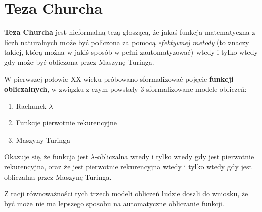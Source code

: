 \section{Teza Churcha}

\textbf{Teza Churcha} jest nieformalną tezą głoszącą, że jakaś funkcja matematyczna z liczb naturalnych może być policzona za pomocą \textit{efektywnej metody} (to znaczy takiej, którą można w jakiś sposób w pełni zautomatyzować) wtedy i tylko wtedy gdy może być obliczona przez Maszynę Turinga. 

W pierwszej połowie XX wieku próbowano sformalizować pojęcie \textbf{funkcji obliczalnych}, w związku z czym powstały 3 sformalizowane modele obliczeń:

\begin{enumerate}
    \item Rachunek \(\lambda\)
    \item Funkcje pierwotnie rekurencyjne
    \item Maszyny Turinga
\end{enumerate}

Okazuje się, że funkcja jest \(\lambda\)-obliczalna wtedy i tylko wtedy gdy jest pierwotnie rekurencyjna, oraz że jest pierwotnie rekurencyjna wtedy i tylko wtedy gdy jest obliczalna przez Maszynę Turinga.

Z racji równoważności tych trzech modeli obliczeń ludzie doszli do wniosku, że być może nie ma lepszego sposobu na automatyczne obliczanie funkcji. 